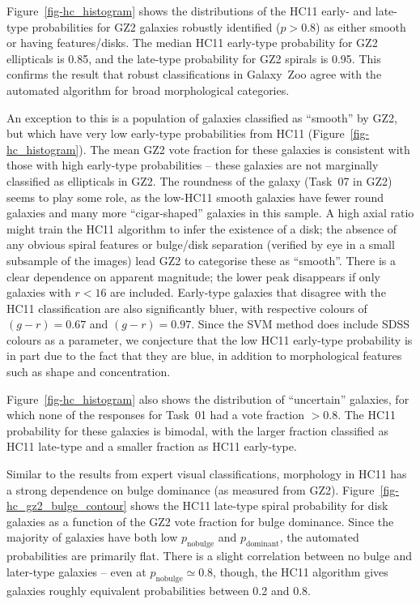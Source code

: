 \documentclass[useAMS,usenatbib]{mn2e}
\begin{document}
Figure~\ref{fig-hc_histogram} shows the distributions of the HC11 early- and late-type probabilities for GZ2 galaxies robustly identified ($p>0.8$) as either smooth or having features/disks. The median HC11 early-type probability for GZ2 ellipticals is 0.85, and the late-type probability for GZ2 spirals is 0.95. This confirms the result that robust classifications in Galaxy~Zoo agree with the automated algorithm for broad morphological categories. 

An exception to this is a population of galaxies classified as ``smooth'' by GZ2, but which have very low early-type probabilities from HC11 (Figure~\ref{fig-hc_histogram}). The mean GZ2 vote fraction for these galaxies is consistent with those with high early-type probabilities -- these galaxies are not marginally classified as ellipticals in GZ2. The roundness of the galaxy (Task~07 in GZ2) seems to play some role, as the low-HC11 smooth galaxies have fewer round galaxies and many more ``cigar-shaped'' galaxies in this sample. A high axial ratio might train the HC11 algorithm to infer the existence of a disk; the absence of any obvious spiral features or bulge/disk separation (verified by eye in a small subsample of the images) lead GZ2 to categorise these as ``smooth''. There is a clear dependence on apparent magnitude; the lower peak disappears if only galaxies with $r<16$ are included. Early-type galaxies that disagree with the HC11 classification are also significantly bluer, with respective colours of $(g-r)=0.67$ and $(g-r)=0.97$. Since the SVM method does include SDSS colours as a parameter, we conjecture that the low HC11 early-type probability is in part due to the fact that they are blue, in addition to morphological features such as shape and concentration. %

Figure~\ref{fig-hc_histogram} also shows the distribution of ``uncertain'' galaxies, for which none of the responses for Task~01 had a vote fraction $>0.8$. The HC11 probability for these galaxies is bimodal, with the larger fraction classified as HC11 late-type and a smaller fraction as HC11 early-type. 

Similar to the results from expert visual classifications, morphology in HC11 has a strong dependence on bulge dominance (as measured from GZ2). Figure~\ref{fig-hc_gz2_bulge_contour} shows the HC11 late-type spiral probability for disk galaxies as a function of the GZ2 vote fraction for bulge dominance. Since the majority of galaxies have both low $p_\mathrm{no bulge}$ and $p_\mathrm{dominant}$, the automated probabilities are primarily flat. There is a slight correlation between no bulge and later-type galaxies -- even at $p_\mathrm{no bulge}\simeq0.8$, though, the HC11 algorithm gives galaxies roughly equivalent probabilities between 0.2 and 0.8. 
\end{document}
